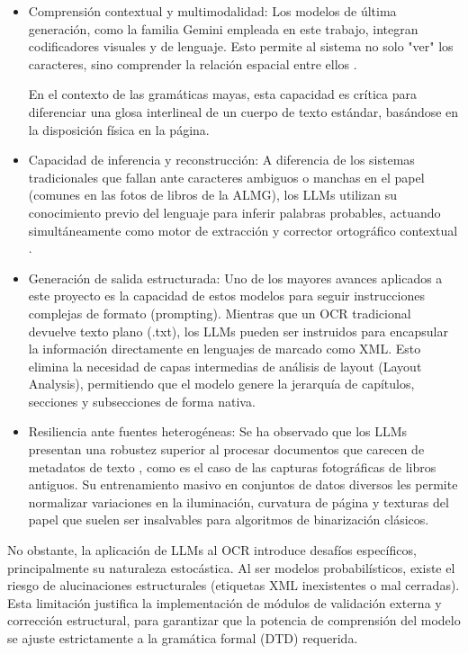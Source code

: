 \begin{itemize}
    \item Comprensión contextual y multimodalidad: Los modelos de última generación, como la familia Gemini empleada en este trabajo, integran codificadores visuales y de lenguaje. Esto permite al sistema no solo "ver" los caracteres, sino comprender la relación espacial entre ellos
    \parencite{ding2026surveymllmbasedvisuallyrich}.



    En el contexto de las gramáticas mayas, esta capacidad es crítica para diferenciar una glosa interlineal de un cuerpo de texto estándar, basándose en la disposición física en la página.
    
    \item Capacidad de inferencia y reconstrucción: A diferencia de los sistemas tradicionales que fallan ante caracteres ambiguos o manchas en el papel (comunes en las fotos de libros de la ALMG), los LLMs utilizan su conocimiento previo del lenguaje para inferir palabras probables, actuando simultáneamente como motor de extracción y corrector ortográfico contextual
    \parencite{11451708}.

    \item Generación de salida estructurada: Uno de los mayores avances aplicados a este proyecto es la capacidad de estos modelos para seguir instrucciones complejas de formato (prompting). Mientras que un OCR tradicional devuelve texto plano (.txt), los LLMs pueden ser instruidos para encapsular la información directamente en lenguajes de marcado como XML. Esto elimina la necesidad de capas intermedias de análisis de layout (Layout Analysis), permitiendo que el modelo genere la jerarquía de capítulos, secciones y subsecciones de forma nativa.
    \item Resiliencia ante fuentes heterogéneas: Se ha observado que los LLMs presentan una robustez superior al procesar documentos que carecen de metadatos de texto \parencite{miller2025ocr}, como es el caso de las capturas fotográficas de libros antiguos. Su entrenamiento masivo en conjuntos de datos diversos les permite normalizar variaciones en la iluminación, curvatura de página y texturas del papel que suelen ser insalvables para algoritmos de binarización clásicos.
\end{itemize}

No obstante, la aplicación de LLMs al OCR introduce desafíos específicos, principalmente su naturaleza estocástica. Al ser modelos probabilísticos, existe el riesgo de alucinaciones estructurales (etiquetas XML inexistentes o mal cerradas). Esta limitación justifica la implementación de módulos de validación externa y corrección estructural, para garantizar que la potencia de comprensión del modelo se ajuste estrictamente a la gramática formal (DTD) requerida.



